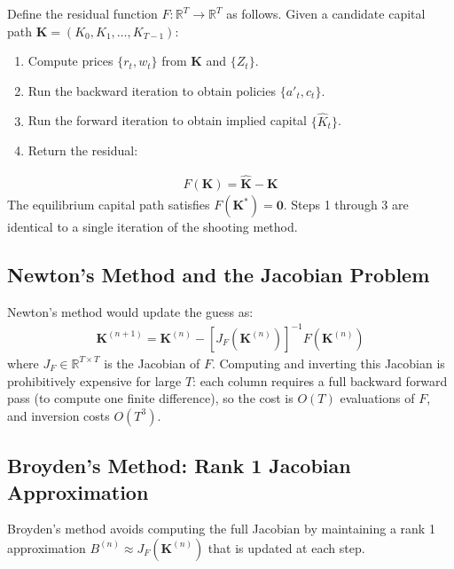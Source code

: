\documentclass[12pt]{article}
\newcommand{\R}{\mathbb{R}}
\begin{document}
Define the residual function $F: \R^T \to \R^T$ as follows. Given a candidate capital path $\mathbf{K} = (K_0, K_1, \ldots, K_{T-1})$:
\begin{enumerate}[nosep]
    \item Compute prices $\{r_t, w_t\}$ from $\mathbf{K}$ and $\{Z_t\}$.
    \item Run the backward iteration to obtain policies $\{a'_t, c_t\}$.
    \item Run the forward iteration to obtain implied capital $\{\hat{K}_t\}$.
    \item Return the residual:
\end{enumerate}
\begin{align}
    F(\mathbf{K}) = \hat{\mathbf{K}} - \mathbf{K} \label{eq:residual}
\end{align}
The equilibrium capital path satisfies $F(\mathbf{K}^*) = \mathbf{0}$. Steps 1 through 3 are identical to a single iteration of the shooting method.

\subsection{Newton's Method and the Jacobian Problem}

Newton's method would update the guess as:
\begin{align}
    \mathbf{K}^{(n+1)} = \mathbf{K}^{(n)} - \left[J_F(\mathbf{K}^{(n)})\right]^{-1} F(\mathbf{K}^{(n)}) \label{eq:newton}
\end{align}
where $J_F \in \R^{T \times T}$ is the Jacobian of $F$. Computing and inverting this Jacobian is prohibitively expensive for large $T$: each column requires a full backward forward pass (to compute one finite difference), so the cost is $O(T)$ evaluations of $F$, and inversion costs $O(T^3)$.

\subsection{Broyden's Method: Rank 1 Jacobian Approximation}

Broyden's method avoids computing the full Jacobian by maintaining a rank 1 approximation $B^{(n)} \approx J_F(\mathbf{K}^{(n)})$ that is updated at each step.
\end{document}
